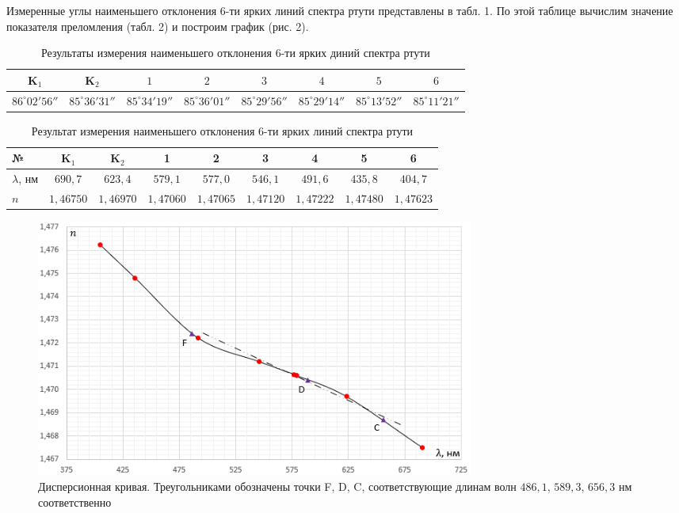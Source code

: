 \documentclass[a4paper]{article}
\begin{document}
Измеренные углы наименьшего отклонения 6-ти ярких линий спектра ртути представлены в табл. 1. По этой таблице вычислим значение показателя преломления (табл. 2) и построим график (рис. 2). 

\begin{table}[!ht]
    \centering
    \caption{Результаты измерения наименьшего отклонения 6-ти ярких диний спектра ртути}
    \begin{tabular}{|c|c|c|c|c|c|c|c|}
    \hline
    K$_1$                 & K$_2$                 & $1$                   & $2$                   & $3$                   & $4$                   & $5$                   & $6$                   \\ \hline
    $86^{\circ} 02' 56''$ & $85^{\circ} 36' 31''$ & $85^{\circ} 34' 19''$ & $85^{\circ} 36' 01''$ & $85^{\circ} 29' 56''$ & $85^{\circ} 29' 14''$ & $85^{\circ} 13' 52''$ & $85^{\circ} 11' 21''$ \\ \hline
    \end{tabular}
    \end{table}

\begin{table}[!ht]
    \centering
    \caption{Результат измерения наименьшего отклонения 6-ти ярких линий спектра ртути}
    \begin{tabular}{|l|c|c|c|c|c|c|c|c|}
    \hline
    №             & K$_1$     & K$_2$     & 1         & 2         & 3         & 4         & 5         & 6         \\ \hline
    $\lambda$, нм & $690,7$   & $623,4$   & $579,1$   & $577,0$   & $546,1$   & $491,6$   & $435,8$   & $404,7$   \\ \hline
    $n$           & $1,46750$ & $1,46970$ & $1,47060$ & $1,47065$ & $1,47120$ & $1,47222$ & $1,47480$ & $1,47623$ \\ \hline
    \end{tabular}
    \end{table}

    \begin{figure}[ht!]
        \centering
        \includegraphics[width = 0.7\textwidth]{image/graph1.png}
        \caption{Дисперсионная кривая. Треугольниками обозначены точки F, D, C, соответствующие длинам волн $486,1$, $589,3$, $656,3$ нм соответственно}
    \end{figure}
    
\end{document}
